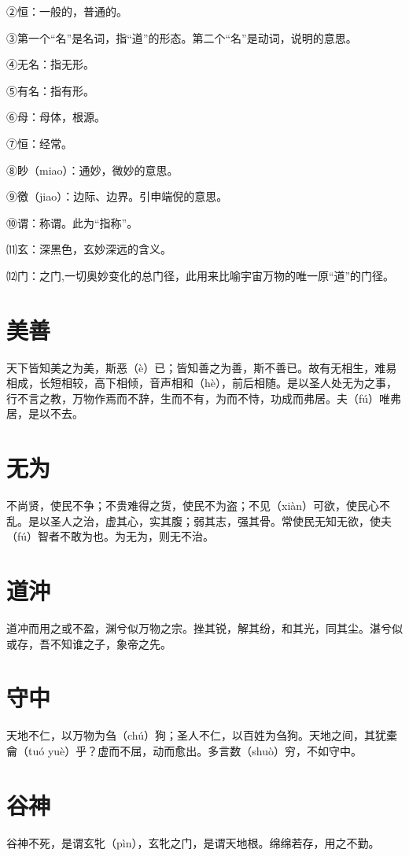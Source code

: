 \documentclass[a4paper,12pt,UTF8,twoside]{ctexbook}
\begin{document}
	
	②恒：一般的，普通的。
	
	③第一个“名”是名词，指“道”的形态。第二个“名”是动词，说明的意思。
	
	④无名：指无形。
	
	⑤有名：指有形。
	
	⑥母：母体，根源。
	
	⑦恒：经常。
	
	⑧眇（miao）：通妙，微妙的意思。
	
	⑨徼（jiao）：边际、边界。引申端倪的意思。
	
	⑩谓：称谓。此为“指称”。
	
	⑾玄：深黑色，玄妙深远的含义。
	
	⑿门：之门,一切奥妙变化的总门径，此用来比喻宇宙万物的唯一原“道”的门径。
	
	\chapter{美善}
	
	天下皆知美之为美，斯恶（è）已；皆知善之为善，斯不善已。故有无相生，难易相成，长短相较，高下相倾，音声相和（hè），前后相随。是以圣人处无为之事，行不言之教，万物作焉而不辞，生而不有，为而不恃，功成而弗居。夫（fú）唯弗居，是以不去。
	
	\chapter{无为}
	
	不尚贤，使民不争；不贵难得之货，使民不为盗；不见（xiàn）可欲，使民心不乱。是以圣人之治，虚其心，实其腹；弱其志，强其骨。常使民无知无欲，使夫（fú）智者不敢为也。为无为，则无不治。
	
	\chapter{道沖}
	道冲而用之或不盈，渊兮似万物之宗。挫其锐，解其纷，和其光，同其尘。湛兮似或存，吾不知谁之子，象帝之先。
	
	
	\chapter{守中}
	
	天地不仁，以万物为刍（chú）狗；圣人不仁，以百姓为刍狗。天地之间，其犹橐龠（tuó	yuè）乎？虚而不屈，动而愈出。多言数（shuò）穷，不如守中。
	
	
	
	
	\chapter{谷神}
	谷神不死，是谓玄牝（pìn），玄牝之门，是谓天地根。绵绵若存，用之不勤。
	
\end{document}

